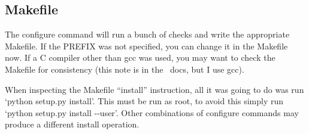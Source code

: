 \documentclass[10pt,letterpaper]{article}
\begin{document}
\subsection{Makefile}
The configure command will run a bunch of checks and write the appropriate Makefile.
If the PREFIX was not specified, you can change it in the Makefile now. If a C compiler
other than gcc was used, you may want to check the Makefile for consistency (this note
is in the \shtns\ docs, but I use gcc).

When inspecting the Makefile ``install'' instruction, all it was going to do was run
`python setup.py install'. This must be run as root, to avoid this simply run
`python setup.py install -{}-user'. Other combinations of configure commands may
produce a different install operation.
\end{document}
